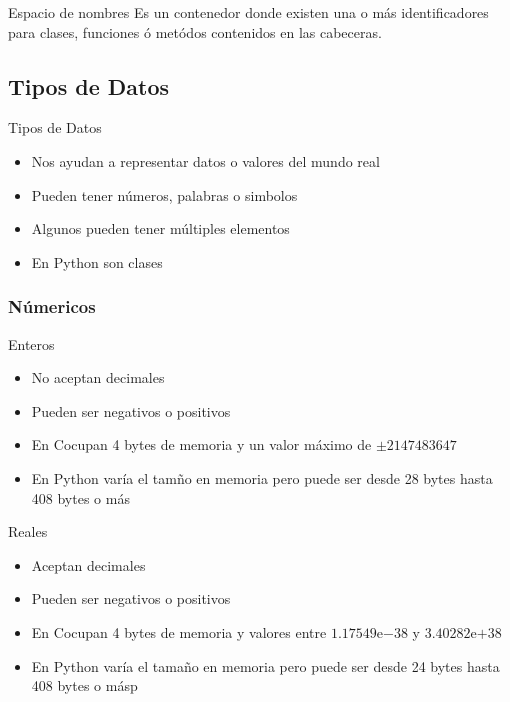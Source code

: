 \documentclass{beamer}
\newcommand{\Rplus}{\protect\hspace{-.1em}\protect\raisebox{.35ex}{\smaller{\smaller\textbf{+}}}}
\newcommand{\Cpp}{\mbox{C\Rplus\Rplus}\hspace{3pt}}
\newcommand{\expnumber}[2]{{#1}\mathrm{e}{#2}}
\begin{document}
\begin{frame}{Espacio de nombres}
	Es un contenedor donde existen una o m\'as identificadores para clases, funciones \'o met\'odos contenidos en las cabeceras.
\end{frame}


\subsection{Tipos de Datos}

\begin{frame}{Tipos de Datos}
	\begin{itemize}
		\item Nos ayudan a representar datos o valores del mundo real
		\item Pueden tener n\'umeros, palabras o simbolos
		\item Algunos pueden tener m\'ultiples elementos 
		\item En Python son clases
	\end{itemize}
\end{frame}

\subsubsection{N\'umericos}

\begin{frame}{Enteros}
    \begin{itemize}
        \item No aceptan decimales
        \item Pueden ser negativos o positivos
        \item En \Cpp ocupan 4 bytes de memoria y un valor m\'aximo de $\pm 2147483647$ 
        \item En Python var\'ia el tamño en memoria pero puede ser desde 28 bytes hasta 408 bytes o m\'as
    \end{itemize}
\end{frame}

\begin{frame}{Reales}
    \begin{itemize}
        \item Aceptan decimales
        \item Pueden ser negativos o positivos
        \item En \Cpp  ocupan 4 bytes de memoria y valores entre $\expnumber{1.17549}{-38}$ y $\expnumber{3.40282}{+38}$ 
        \item En Python var\'ia el tamaño en memoria pero puede ser desde 24 bytes hasta 408 bytes o m\'asp
    \end{itemize}
\end{frame}
\end{document}
